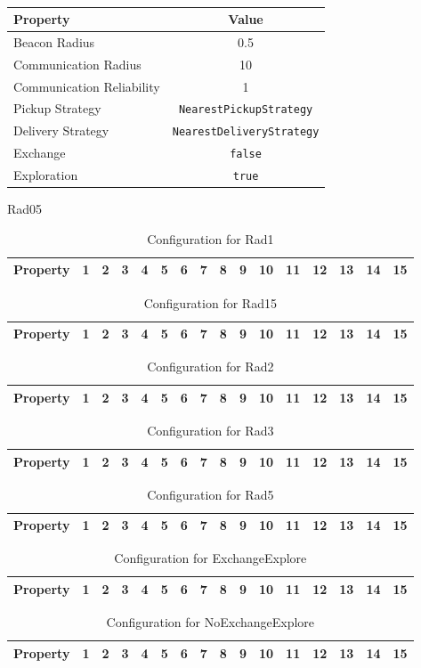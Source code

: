 \documentclass[10pt]{article}
\newcommand{\runtimeconfig}[9]{%
\begin{table}
	\centering
	\begin{tabular}{lc}
	\toprule
	Property & Value \\
	\midrule
	Beacon Radius & #2 \\
	Communication Radius & #3 \\
	Communication Reliability & #4 \\
	Pickup Strategy & \texttt{#5} \\
	Delivery Strategy & \texttt{#6} \\
	Exchange & \texttt{#7} \\
	Exploration & \texttt{#8} \\
	\bottomrule
	\end{tabular}
	\label{table:config:#1}
	\caption{#9}
\end{table}
}
\newcommand{\datatable}[1]{%
\begin{table}
	\centering
	\begin{tabular}{lccccccccccccccc}
	\toprule
	Property & 1 & 2 & 3 & 4 & 5 & 6 & 7 & 8 & 9 & 10 & 11 & 12 & 13 & 14 & 15 \\
	\midrule
	
	\bottomrule
	\end{tabular}
	\label{table:data:#1}
	\caption{Configuration for #1}
\end{table}
}
\begin{document}
\runtimeconfig{Rad05}{0.5}{10}{1}{NearestPickupStrategy}{NearestDeliveryStrategy}{false}{true}

\datatable{Rad05}
\datatable{Rad1}
\datatable{Rad15}
\datatable{Rad2}
\datatable{Rad3}
\datatable{Rad5}
\datatable{ExchangeExplore}
\datatable{NoExchangeExplore}
\end{document}
